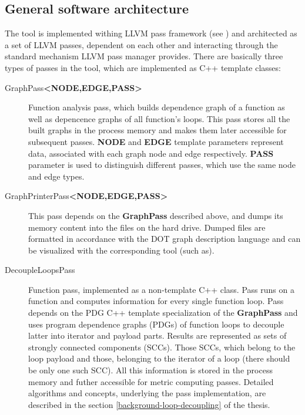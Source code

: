 \subsection{General software architecture} \label{tool-general-software-architecture}
\qquad The tool is implemented withing LLVM pass framework (see \cite{llvm-online-docs-pass-framework}) and architected as a set of LLVM passes, dependent on each other and interacting through the standard mechanism LLVM pass manager provides. There are basically three types of passes in the tool, which are implemented as C++ template classes:
\begin{description}
	
	\item [GraphPass\textbf{\textless NODE,EDGE,PASS\textgreater}] Function analysis pass, which builds dependence graph of a function as well as depencence graphs of all function's loops. This pass stores all the built graphs in the process memory and makes them later accessible for subsequent passes. \textbf{NODE} and \textbf{EDGE} template parameters represent data, associated with each graph node and edge respectively. \textbf{PASS} parameter is used to distinguish different passes, which use the same node and edge types. 

	\item [GraphPrinterPass\textbf{\textless NODE,EDGE,PASS\textgreater}] This pass depends on the \textbf{GraphPass} described above, and dumps its memory content into the files on the hard drive. Dumped files are formatted in accordance with the DOT graph description language and can be visualized with the corresponding tool (such as).    

	\item [DecoupleLoopsPass] Function pass, implemented as a non-template C++ class. Pass runs on a function and computes information for every single function loop. Pass depends on the PDG C++ template specialization of the \textbf{GraphPass} and uses program dependence graphs (PDGs) of function loops to decouple latter into iterator and payload parts. Results are represented as sets of strongly connected components (SCCs). Those SCCs, which belong to the loop payload and those, belonging to the iterator of a loop (there should be only one such SCC). All this information is stored in the process memory and futher accessible for metric computing passes. Detailed algorithms and concepts, underlying the pass implementation, are described in the section \ref{background-loop-decoupling} of the thesis.  


\end{description}
